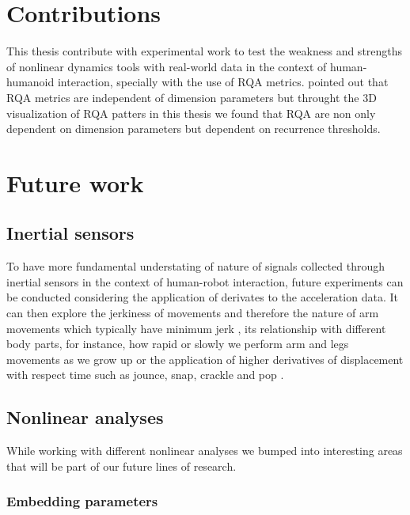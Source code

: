 \section{Contributions}

This thesis contribute with experimental work 
to test the weakness and strengths of nonlinear dynamics tools
with real-world data in the context of human-humanoid interaction, 
specially with the use of RQA metrics.
\cite{iwanski1998} pointed out that RQA metrics are independent of 
dimension parameters but throught the 3D visualization of 
RQA patters in this thesis we found that RQA are non only dependent 
on dimension parameters but dependent on recurrence thresholds.










\section{Future work}

\subsection{Inertial sensors}
To have more fundamental understating of nature of signals collected 
through inertial sensors in the context of human-robot interaction,
future experiments can be conducted considering the application of 
derivates to the acceleration data. 
It can then explore the jerkiness of movements and therefore the nature 
of arm movements which typically have minimum jerk \citep{flash1985},
its relationship with different body parts, for instance, 
how rapid or slowly we perform arm and legs 
movements as we grow up \citep{devries1982, mori2012} 
or the application of higher derivatives of displacement with respect time 
such as jounce, snap, crackle and pop \citep{eager2016}.


\subsection{Nonlinear analyses}

While working with different nonlinear analyses we bumped into 
interesting areas that will be part of our future lines of research.

\subsubsection{Embedding parameters}

